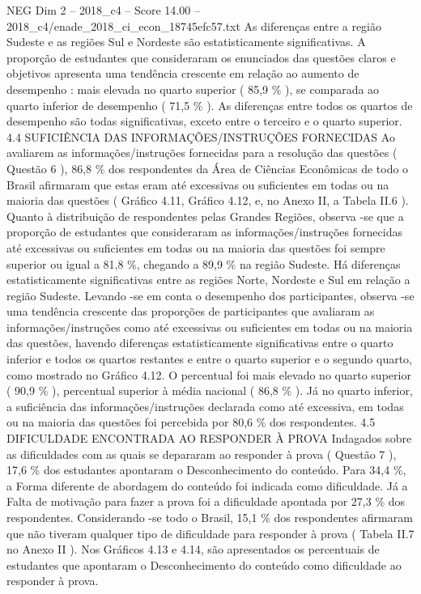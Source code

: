 \begin{textsample}{NEG Dim 2 – 2018\_c4 – Score 14.00 – 2018\_c4/enade\_2018\_ci\_econ\_18745efc57.txt}
As diferenças entre a região Sudeste e as regiões Sul e Nordeste são estatisticamente significativas.
A proporção de estudantes que consideraram os enunciados das questões claros e objetivos apresenta uma tendência crescente em relação ao aumento de desempenho : mais elevada no quarto superior ( 85,9 \% ), se comparada ao quarto inferior de desempenho ( 71,5 \% ).
As diferenças entre todos os quartos de desempenho são todas significativas, exceto entre o terceiro e o quarto superior. 4.4 SUFICIÊNCIA DAS INFORMAÇÕES/INSTRUÇÕES FORNECIDAS Ao avaliarem as informações/instruções fornecidas para a resolução das questões ( Questão 6 ), 86,8 \% dos respondentes da Área de Ciências Econômicas de todo o Brasil afirmaram que estas eram até excessivas ou suficientes em todas ou na maioria das questões ( Gráfico 4.11, Gráfico 4.12, e, no Anexo II, a Tabela II.6 ).
Quanto à distribuição de respondentes pelas Grandes Regiões, observa -se que a proporção de estudantes que consideraram as informações/instruções fornecidas até excessivas ou suficientes em todas ou na maioria das questões foi sempre superior ou igual a 81,8 \%, chegando a 89,9 \% na região Sudeste.
Há diferenças estatisticamente significativas entre as regiões Norte, Nordeste e Sul em relação a região Sudeste.
Levando -se em conta o desempenho dos participantes, observa -se uma tendência crescente das proporções de participantes que avaliaram as informações/instruções como até excessivas ou suficientes em todas ou na maioria das questões, havendo diferenças estatisticamente significativas entre o quarto inferior e todos os quartos restantes e entre o quarto superior e o segundo quarto, como mostrado no Gráfico 4.12.
O percentual foi mais elevado no quarto superior ( 90,9 \% ), percentual superior à média nacional ( 86,8 \% ).
Já no quarto inferior, a suficiência das informações/instruções declarada como até excessiva, em todas ou na maioria das questões foi percebida por 80,6 \% dos respondentes. 4.5 DIFICULDADE ENCONTRADA AO RESPONDER À PROVA Indagados sobre as dificuldades com as quais se depararam ao responder à prova ( Questão 7 ), 17,6 \% dos estudantes apontaram o Desconhecimento do conteúdo.
Para 34,4 \%, a Forma diferente de abordagem do conteúdo foi indicada como dificuldade.
Já a Falta de motivação para fazer a prova foi a dificuldade apontada por 27,3 \% dos respondentes.
Considerando -se todo o Brasil, 15,1 \% dos respondentes afirmaram que não tiveram qualquer tipo de dificuldade para responder à prova ( Tabela II.7 no Anexo II ).
Nos Gráficos 4.13 e 4.14, são apresentados os percentuais de estudantes que apontaram o Desconhecimento do conteúdo como dificuldade ao responder à prova.

\end{textsample}
